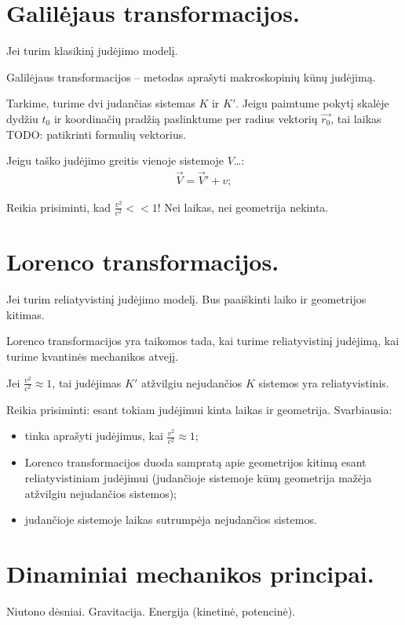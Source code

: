 \section{Galilėjaus transformacijos.}

Jei turim klasikinį judėjimo modelį.

Galilėjaus transformacijos – metodas aprašyti makroskopinių kūnų
judėjimą.

Tarkime, turime dvi judančias sistemas $K$ ir $K'$. Jeigu paimtume
pokytį skalėje dydžiu $t_{0}$ ir koordinačių pradžią paslinktume
per radius vektorių $\vec{r_{0}}$, tai laikas TODO: patikrinti formulių
vektorius.


Jeigu taško judėjimo greitis vienoje sistemoje $V$…:
\begin{align*}
  \vec{V} = \vec{V}' + v;
\end{align*}

Reikia prisiminti, kad $\frac{v^{2}}{c^{2}} << 1$! Nei laikas, nei
geometrija nekinta.

\section{Lorenco transformacijos.}

Jei turim reliatyvistinį judėjimo modelį. Bus paaiškinti laiko ir
geometrijos kitimas.

Lorenco transformacijos yra taikomos tada, kai turime reliatyvistinį
judėjimą, kai turime kvantinės mechanikos atvejį.

Jei $\frac{v^{2}}{c^{2}} \approx 1$, tai judėjimas $K'$ atžvilgiu
nejudančios $K$ sistemos yra reliatyvistinis.

Reikia prisiminti: esant tokiam judėjimui kinta laikas ir geometrija.
Svarbiausia:
\begin{itemize}
  \item tinka aprašyti judėjimus, kai $\frac{v^{2}}{c^{2}} \approx 1$;
  \item Lorenco transformacijos duoda sampratą apie geometrijos
    kitimą esant reliatyvistiniam judėjimui (judančioje sistemoje
    kūnų geometrija mažėja atžvilgiu nejudančios sistemos);
  \item judančioje sistemoje laikas sutrumpėja nejudančios sistemos.
\end{itemize}

\section{Dinaminiai mechanikos principai.}
Niutono dėsniai. Gravitacija. Energija (kinetinė, potencinė).

